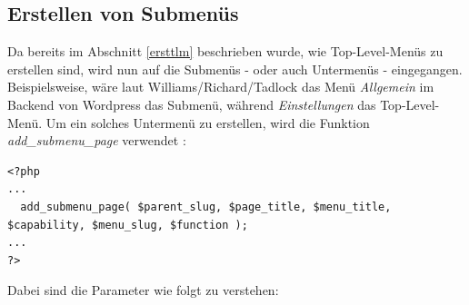 \subsection{Erstellen von Submenüs}\label{erstum}
Da bereits im Abschnitt \ref{ersttlm} beschrieben wurde, wie Top-Level-Menüs zu erstellen sind, wird nun auf die Submenüs - oder auch Untermenüs - eingegangen.\newline
Beispielsweise, wäre laut Williams/Richard/Tadlock  das Menü \emph{Allgemein} im Backend von Wordpress das Submenü, während \emph{Einstellungen} das Top-Level-Menü. \newline
Um ein solches Untermenü zu erstellen, wird die Funktion \emph{add\_submenu\_page} verwendet :
\begin{lstlisting}
<?php 
...
  add_submenu_page( $parent_slug, $page_title, $menu_title, $capability, $menu_slug, $function ); 
...
?>
\end{lstlisting}
Dabei sind die Parameter wie folgt zu verstehen:
